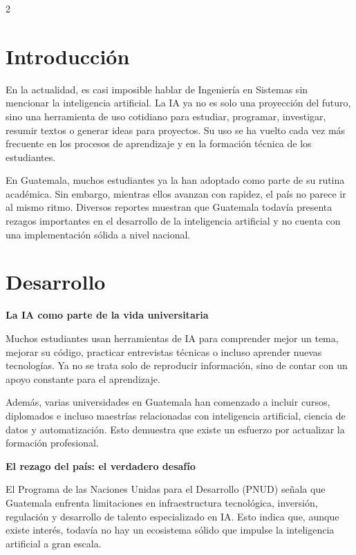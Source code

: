 \documentclass[10pt,spanish,Letterpaper,openany]{book}
\let\origtextbf\textbf
\renewcommand{\textbf}[1]{{\color{textlinetitle}\origtextbf{#1}}}
\begin{document}
\begin {multicols}{2}

\section{Introducción}\label{introducciuxf3n-16}

En la actualidad, es casi imposible hablar de Ingeniería en Sistemas sin mencionar la inteligencia artificial. La IA ya no es solo una proyección del futuro, sino una herramienta de uso cotidiano para estudiar, programar, investigar, resumir textos o generar ideas para proyectos. Su uso se ha vuelto cada vez más frecuente en los procesos de aprendizaje y en la formación técnica de los estudiantes.

En Guatemala, muchos estudiantes ya la han adoptado como parte de su rutina académica. Sin embargo, mientras ellos avanzan con rapidez, el país no parece ir al mismo ritmo. Diversos reportes muestran que Guatemala todavía presenta rezagos importantes en el desarrollo de la inteligencia artificial y no cuenta con una implementación sólida a nivel nacional.

\section{Desarrollo}\label{desarrollo-6}

\textbf{La IA como parte de la vida universitaria}

Muchos estudiantes usan herramientas de IA para comprender mejor un tema, mejorar su código, practicar entrevistas técnicas o incluso aprender nuevas tecnologías. Ya no se trata solo de reproducir información, sino de contar con un apoyo constante para el aprendizaje.

Además, varias universidades en Guatemala han comenzado a incluir cursos, diplomados e incluso maestrías relacionadas con inteligencia artificial, ciencia de datos y automatización. Esto demuestra que existe un esfuerzo por actualizar la formación profesional.

\textbf{El rezago del país: el verdadero desafío}

El Programa de las Naciones Unidas para el Desarrollo (PNUD) señala que Guatemala enfrenta limitaciones en infraestructura tecnológica, inversión, regulación y desarrollo de talento especializado en IA. Esto indica que, aunque existe interés, todavía no hay un ecosistema sólido que impulse la inteligencia artificial a gran escala.


\end{multicols}
\end{document}
